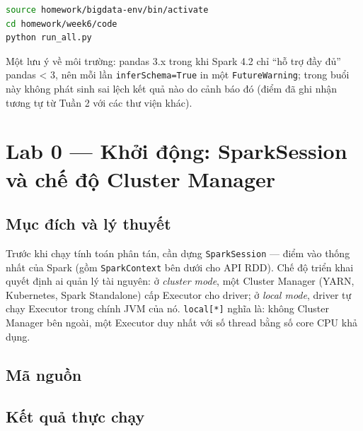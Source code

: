 \documentclass[12pt,a4paper,oneside]{article}
\begin{document}
\begin{lstlisting}[language=bash, caption={Lệnh kích hoạt môi trường và chạy toàn bộ lab}, label={lst:chaylab}]
source homework/bigdata-env/bin/activate
cd homework/week6/code
python run_all.py
\end{lstlisting}

Một lưu ý về môi trường: pandas 3.x trong khi Spark 4.2 chỉ ``hỗ trợ đầy đủ'' pandas < 3, nên mỗi lần \texttt{inferSchema=True} in một \texttt{FutureWarning}; trong buổi này không phát sinh sai lệch kết quả nào do cảnh báo đó (điểm đã ghi nhận tương tự từ Tuần 2 với các thư viện khác).

\section{Lab 0 --- Khởi động: SparkSession và chế độ Cluster Manager}
\label{sec:lab0}

\subsection{Mục đích và lý thuyết}

Trước khi chạy tính toán phân tán, cần dựng \texttt{SparkSession} --- điểm vào thống nhất của Spark (gồm \texttt{SparkContext} bên dưới cho API RDD). Chế độ triển khai quyết định ai quản lý tài nguyên: ở \emph{cluster mode}, một Cluster Manager (YARN, Kubernetes, Spark Standalone) cấp Executor cho driver; ở \emph{local mode}, driver tự chạy Executor trong chính JVM của nó. \texttt{local[*]} nghĩa là: không Cluster Manager bên ngoài, một Executor duy nhất với số thread bằng số core CPU khả dụng.

\subsection{Mã nguồn}



\subsection{Kết quả thực chạy}


\end{document}
